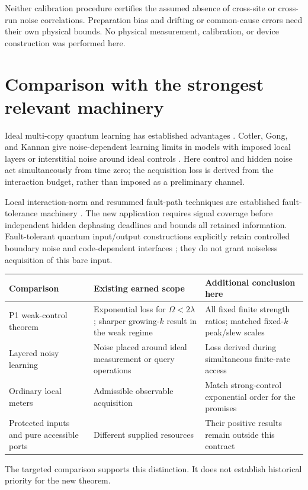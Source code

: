 \documentclass[11pt,a4paper]{article}
\begin{document}
Neither calibration procedure certifies the assumed absence of cross-site or cross-run noise correlations. Preparation bias and drifting or common-cause errors need their own physical bounds. No physical measurement, calibration, or device construction was performed here.

\section{Comparison with the strongest relevant machinery}

Ideal multi-copy quantum learning has established advantages \cite{huang}. Cotler, Gong, and Kannan give noise-dependent learning limits in models with imposed local layers or interstitial noise around ideal controls \cite{cotler}. Here control and hidden noise act simultaneously from time zero; the acquisition loss is derived from the interaction budget, rather than imposed as a preliminary channel.

Local interaction-norm and resummed fault-path techniques are established fault-tolerance machinery \cite{terhal,akp}. The new application requires signal coverage before independent hidden dephasing deadlines and bounds all retained information. Fault-tolerant quantum input/output constructions explicitly retain controlled boundary noise and code-dependent interfaces \cite{io}; they do not grant noiseless acquisition of this bare input.

\begin{center}
\begin{tabular}{p{38mm}p{48mm}p{58mm}}
\toprule
Comparison & Existing earned scope & Additional conclusion here \\
\midrule
P1 weak-control theorem & Exponential loss for $\Omega<2\lambda$; sharper growing-$k$ result in the weak regime & All fixed finite strength ratios; matched fixed-$k$ peak/slew scales \\
Layered noisy learning & Noise placed around ideal measurement or query operations & Loss derived during simultaneous finite-rate access \\
Ordinary local meters & Admissible observable acquisition & Match strong-control exponential order for the promises \\
Protected inputs and pure accessible ports & Different supplied resources & Their positive results remain outside this contract \\
\bottomrule
\end{tabular}
\end{center}
The targeted comparison supports this distinction. It does not establish historical priority for the new theorem.
\end{document}
